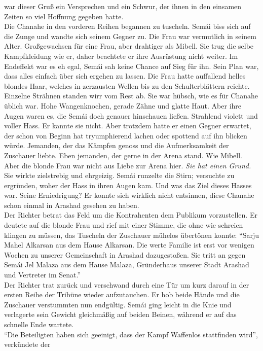 war dieser Gruß ein Versprechen und ein Schwur, der ihnen in den einsamen Zeiten so viel Hoffnung 
gegeben hatte. \\
Die Chanahe in den vorderen Reihen begannen zu tuscheln. Semái biss sich auf die Zunge und wandte 
sich seinem Gegner zu. Die Frau war vermutlich in seinem Alter. Großgewachsen für eine Frau, aber 
drahtiger als Mibell. Sie trug die selbe Kampfkleidung wie er, daher beachtete er ihre Ausrüstung 
nicht weiter. Im Endeffekt war es eh egal, Semái sah keine Chance auf Sieg für ihn. Sein Plan war, 
dass alles einfach über sich ergehen zu lassen. Die Frau hatte auffallend helles blondes Haar, 
welches in zerzausten Wellen bis zu den Schulterblättern reichte. Einzelne Strähnen standen wirr 
vom Rest ab. Sie war hübsch, wie es für Chanahe üblich war. Hohe Wangenknochen, gerade Zähne und 
glatte Haut. Aber ihre Augen waren es, die Semái doch genauer hinschauen ließen. Strahlend violett 
und voller Hass. Er kannte sie nicht. Aber trotzdem hatte er einen Gegner erwartet, der schon von 
Beginn hat tryumphierend lachen oder spottend auf ihn blicken würde. Jemanden, der das Kämpfen 
genoss und die Aufmerksamkeit der Zuschauer liebte. Eben jemanden, der gerne in der Arena stand. 
Wie Mibell. Aber die blonde Frau war nicht aus Liebe zur Arena hier. \textit{Sie hat einen Grund.}\\
Sie wirkte zielstrebig und ehrgeizig. Semái runzelte die Stirn; versuchte zu ergründen, woher der 
Hass in ihren Augen kam. Und was das Ziel dieses Hasses war. Seine Erniedrigung? Er konnte sich 
wirklich nicht entsinnen, diese Chanahe schon einmal in Arashad gesehen zu haben.\\
Der Richter betrat das Feld um die Kontrahenten dem Publikum vorzustellen. Er deutete auf die 
blonde Frau und rief mit einer Stimme, die ohne wie schreien klingen zu müssen, das 
Tuscheln der Zuschauer mühelos übertönen konnte: ``Sarju Mahel Alkarsan aus dem Hause Alkarsan. Die 
werte Familie ist erst vor wenigen Wochen zu unserer Gemeinschaft in Arashad dazugestoßen. Sie 
tritt an gegen Semái Jel Malaza aus dem Hause Malaza, Gründerhaus unserer Stadt Arashad und 
Vertreter im Senat.''\\
Der Richter trat zurück und verschwand durch eine Tür um kurz darauf in der ersten Reihe der 
Tribüne wieder aufzutauchen. Er hob beide Hände und die Zuschauer verstummten nun endgültig. Semái 
ging leicht in die Knie und verlagerte sein Gewicht gleichmäßig auf beiden Beinen, während er auf 
das schnelle Ende wartete.\\
``Die Beteiligten haben sich geeinigt, dass der Kampf Waffenlos stattfinden wird'', verkündete der 
